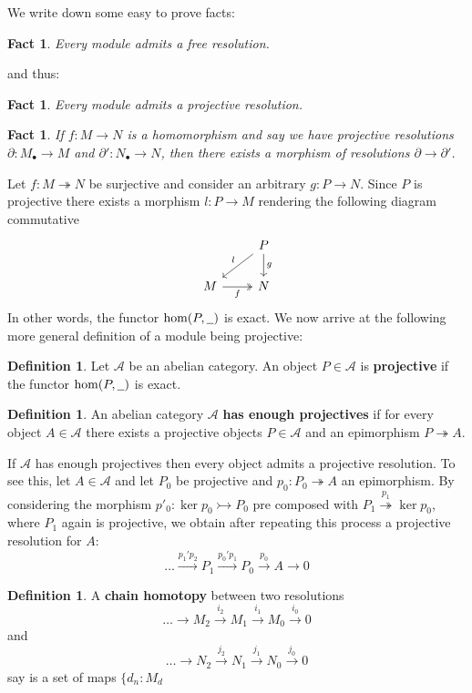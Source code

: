\documentclass[12pt]{article}
\theoremstyle{plain}
\newtheorem{fact}[thm]{Fact}
\theoremstyle{definition}
\newtheorem{defn}[thm]{Definition} %
\newcommand{\scr}[1]{\mathscr{#1}}
\newcommand{\und}[1]{\underline{\hspace{#1 cm}}}
\newcommand{\lto}{\longrightarrow}
\begin{document}
We write down some easy to prove facts:
\begin{fact}
Every module admits a free resolution.
\end{fact}
and thus:
\begin{fact}
Every module admits a projective resolution.
\end{fact}
\begin{fact}
If $f: M \lto N$ is a homomorphism and say we have projective resolutions $\partial: M_{\bullet} \lto M$ and $\partial': N_{\bullet} \lto N$, then there exists a morphism of resolutions $\partial \lto \partial'$.
\end{fact}
Let $f: M \twoheadrightarrow N$ be surjective and consider an arbitrary $g: P \lto N$. Since $P$ is projective there exists a morphism $l: P \lto M$ rendering the following diagram commutative
\begin{equation}
\begin{tikzcd}
& P\arrow[dl,swap,"l"]\arrow[d,"g"]\\
M\arrow[r,swap,twoheadrightarrow,"f"] & N
\end{tikzcd}
\end{equation}
In other words, the functor $\operatorname{hom}(P,\und{0.2})$ is exact. We now arrive at the following more general definition of a module being projective:
\begin{defn}
Let $\scr{A}$ be an abelian category. An object $P \in \scr{A}$ is \textbf{projective} if the functor $\operatorname{hom}(P,\und{0.2})$ is exact.
\end{defn}
\begin{defn}
An abelian category $\scr{A}$ \textbf{has enough projectives} if for every object $A \in \scr{A}$ there exists a projective objects $P \in \scr{A}$ and an epimorphism $P \twoheadrightarrow A$.
\end{defn}
If $\scr{A}$ has enough projectives then every object admits a projective resolution. To see this, let $A \in \scr{A}$ and let $P_0$ be projective and $p_0: P_0 \twoheadrightarrow A$ an epimorphism. By considering the morphism $p'_0: \operatorname{ker}p_0 \rightarrowtail P_0$ pre composed with $P_1 \stackrel{p_1}{\twoheadrightarrow} \operatorname{ker}p_0$, where $P_1$ again is projective, we obtain after repeating this process a projective resolution for $A$:
\begin{equation}
\hdots \stackrel{p_1'p_2}{\lto} P_1 \stackrel{p_0'p_1}{\lto}P_0 \stackrel{p_0}{\lto} A \lto 0
\end{equation}
\begin{defn}
A \textbf{chain homotopy} between two resolutions
\begin{equation}
\hdots \lto M_2 \stackrel{i_2}{\lto} M_1 \stackrel{i_1}{\lto} M_0 \stackrel{i_0}{\lto} 0
\end{equation}
and
\begin{equation}
\hdots \lto N_2 \stackrel{j_2}{\lto} N_1 \stackrel{j_1}{\lto} N_0 \stackrel{j_0}{\lto} 0
\end{equation}
say is a set of maps $\lbrace d_n: M_d$
\end{defn}
\end{document}
